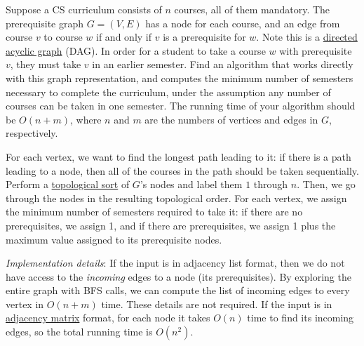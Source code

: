   \begin{exercise}[DPV 3.16]
    Suppose a CS curriculum consists of $n$ courses, all of them mandatory. The prerequisite graph $G = (V,E)$ has a node for each course, and an edge from course $v$ to course $w$ if and only if $v$ is a prerequisite for $w$. Note this is a \hyperref[def:directed-acyclic-graph]{directed acyclic graph} (DAG). In order for a student to take a course $w$ with prerequisite $v$, they must take $v$ in an earlier semester. Find an algorithm that works directly with this graph representation, and computes the minimum number of semesters necessary to complete the curriculum, under the assumption any number of courses can be taken in one semester. The running time of your algorithm should be $O(n+m)$, where $n$ and $m$ are the numbers of vertices and edges in $G$, respectively.
  \end{exercise}
  \begin{solution}
    For each vertex, we want to find the longest path leading to it: if there is a path leading to a node, then all of the courses in the path should be taken sequentially. Perform a \hyperref[def:topological-sort]{topological sort} of $G$'s nodes and label them $1$ through $n$. Then, we go through the nodes in the resulting topological order. For each vertex, we assign the minimum number of semesters required to take it: if there are no prerequisites, we assign 1, and if there are prerequisites, we assign 1 plus the maximum value assigned to its prerequisite nodes.
    
    \textit{Implementation details}: If the input is in adjacency list format, then we do not have access to the \emph{incoming} edges to a node (its prerequisites). By exploring the entire graph with BFS calls, we can compute the list of incoming edges to every vertex in $O(n+m)$ time. These details are not required. If the input is in \hyperref[def:adjacency-matrix]{adjacency matrix} format, for each node it takes $O(n)$ time to find its incoming edges, so the total running time is $O(n^2)$.
  \end{solution}

